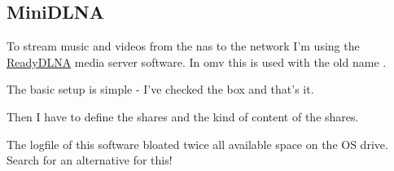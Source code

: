 

\subsection{MiniDLNA}\label{subsec:MiniDLNA}

To stream music and videos from the \gls{nas} to the network I'm using the
\href{https://sourceforge.net/projects/minidlna/}{ReadyDLNA} media server
software. In \gls{omv} this is used with the old name .


The basic setup is simple - I've checked the  box and that's
it.


Then I have to define the shares and the kind of content of the shares.


 The logfile of this software bloated twice all
available space on the OS drive. Search for an alternative for this!
